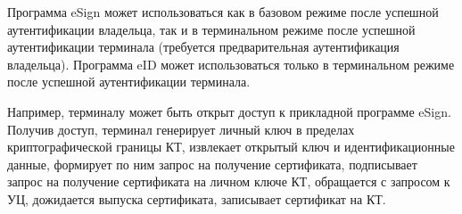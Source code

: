 Программа eSign может использоваться как в базовом режиме 
после успешной аутентификации владельца, так и в терминальном режиме 
после успешной аутентификации терминала (требуется предварительная 
аутентификация владельца). 
%
Программа eID может использоваться только в терминальном режиме
после успешной аутентификации терминала. 


Например, терминалу может быть открыт доступ к прикладной программе eSign.
Получив доступ, терминал генерирует личный ключ в пределах криптографической 
границы КТ, извлекает открытый ключ и идентификационные данные, формирует по 
ним запрос на получение сертификата, подписывает запрос на получение 
сертификата на личном ключе КТ, обращается с запросом к УЦ, дожидается 
выпуска сертификата, записывает сертификат на КТ.
\fi

